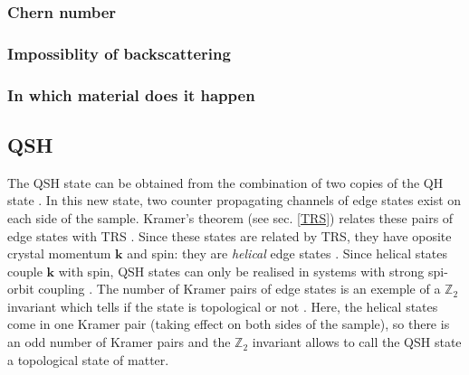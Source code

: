 \subsubsection{Chern number}




\subsubsection{Impossiblity of backscattering}

\subsubsection{In which material does it happen}


\subsection{QSH}

The QSH state can be obtained from the combination of two copies of the QH state \cite{buhmann_quantum_2011}. In this new state, two counter propagating channels of edge states exist on each side of the sample. Kramer's theorem (see sec. \ref{TRS}) relates these pairs of edge states with TRS \cite{buhmann_quantum_2011}. Since these states are related by TRS, they have oposite crystal momentum $\mathbf{k}$ and spin: they are \textit{helical} edge states \cite{bernevig_topological_2013}. Since helical states couple $\mathbf{k}$ with spin, QSH states can only be realised in systems with strong spi-orbit coupling \cite{qi_quantum_2010}. The number of Kramer pairs of edge states is an exemple of a $\mathbb{Z}_2$ invariant which tells if the state is topological or not \cite{koenig_quantum_2008}. Here, the helical states come in one Kramer pair (taking effect on both sides of the sample), so there is an odd number of Kramer pairs and the $\mathbb{Z}_2$ invariant allows to call the QSH state a topological state of matter.\\

